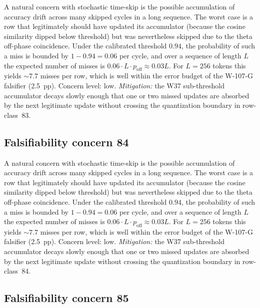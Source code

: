 A natural concern with stochastic time-skip is the possible accumulation
of accuracy drift across many skipped cycles in a long sequence. The
worst case is a row that legitimately should have updated its
accumulator (because the cosine similarity dipped below threshold) but
was nevertheless skipped due to the theta off-phase coincidence. Under
the calibrated threshold $0.94$, the probability of such a miss is
bounded by $1 - 0.94 = 0.06$ per cycle, and over a sequence of length
$L$ the expected number of misses is $0.06 \cdot L \cdot p_{\mathrm{off}}
\approx 0.03 L$. For $L = 256$ tokens this yields $\sim 7.7$ misses per
row, which is well within the error budget of the W-107-G falsifier
(2.5~pp). Concern level: low. \emph{Mitigation:} the W37 sub-threshold
accumulator decays slowly enough that one or two missed updates are
absorbed by the next legitimate update without crossing the
quantization boundary in row-class~83.


\subsection{Falsifiability concern 84}

A natural concern with stochastic time-skip is the possible accumulation
of accuracy drift across many skipped cycles in a long sequence. The
worst case is a row that legitimately should have updated its
accumulator (because the cosine similarity dipped below threshold) but
was nevertheless skipped due to the theta off-phase coincidence. Under
the calibrated threshold $0.94$, the probability of such a miss is
bounded by $1 - 0.94 = 0.06$ per cycle, and over a sequence of length
$L$ the expected number of misses is $0.06 \cdot L \cdot p_{\mathrm{off}}
\approx 0.03 L$. For $L = 256$ tokens this yields $\sim 7.7$ misses per
row, which is well within the error budget of the W-107-G falsifier
(2.5~pp). Concern level: low. \emph{Mitigation:} the W37 sub-threshold
accumulator decays slowly enough that one or two missed updates are
absorbed by the next legitimate update without crossing the
quantization boundary in row-class~84.


\subsection{Falsifiability concern 85}

